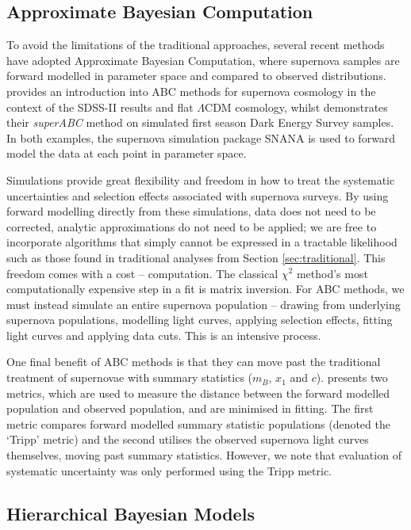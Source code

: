 \documentclass[a4paper,fleqn,usenatbib]{mnras}
\begin{document}
\subsection{Approximate Bayesian Computation}

To avoid the limitations of the traditional approaches, several recent methods have adopted Approximate Bayesian Computation, where supernova samples are forward modelled in parameter space and compared to observed distributions. \citet{Weyant2013} provides an introduction into ABC methods for supernova cosmology in the context of the SDSS-II results \citep{Sako2014} and flat $\Lambda$CDM cosmology, whilst \citet{Jennings2016} demonstrates their \textit{superABC} method on simulated first season Dark Energy Survey samples. In both examples, the supernova simulation package SNANA \citep{Kessler2009a} is used to forward model the data at each point in parameter space.

Simulations provide great flexibility and freedom in how to treat the systematic uncertainties and selection effects associated with supernova surveys. By using forward modelling directly from these simulations, data does not need to be corrected, analytic approximations do not need to be applied; we are free to incorporate algorithms that simply cannot be expressed in a tractable likelihood such as those found in traditional analyses from Section \ref{sec:traditional}. This freedom comes with a cost -- computation. The classical $\chi^2$ method's most computationally expensive step in a fit is matrix inversion. For ABC methods, we must instead simulate an entire supernova population -- drawing from underlying supernova populations, modelling light curves, applying selection effects, fitting light curves and applying data cuts. This is an intensive process.

One final benefit of ABC methods is that they can move past the traditional treatment of supernovae with summary statistics ($m_B$, $x_1$ and $c$). \citet{Jennings2016} presents two metrics, which are used to measure the distance between the forward modelled population and observed population, and are minimised in fitting. The first metric compares forward modelled summary statistic populations (denoted the `Tripp' metric) and the second utilises the observed supernova light curves themselves, moving past summary statistics. However, we note that evaluation of systematic uncertainty was only performed using the Tripp metric.

\subsection{Hierarchical Bayesian Models}
\end{document}

